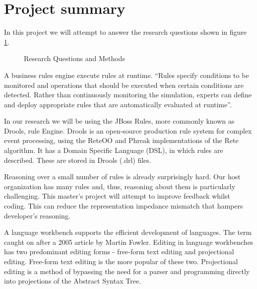 \section{Project summary}

In this project we will attempt to answer the research questions shown in figure \ref{fig:Research_Questions}.
\begin{figure}[H]
    \centering
    \caption{Research Questions and Methods}
    \label{fig:Research_Questions}
\end{figure}


A business rules engine execute rules at runtime. 
``Rules specify conditions to be monitored and operations that should be executed when certain conditions are detected.
Rather than continuously monitoring the simulation, experts can define and deploy appropriate rules that are automatically evaluated at runtime''\cite{liu2003dios++}. 

In our research we will be using the JBoss Rules, more commonly known as Drools, rule Engine\cite{browne2009jboss}.
Drools is an open-source production rule system for complex event processing, using the ReteOO and Phreak implementations of the Rete algorithm\cite{forgy1989rete}.
It has a Domain Specific Language (DSL), in which rules are described.
These are stored in Drools (.drl) files. 

Reasoning over a small number of rules is already surprisingly hard.
Our host organization has many rules and, thus, reasoning about them is particularly challenging.
This master's project will attempt to improve feedback whilst coding.
This can reduce the representation impedance mismatch that hampers developer's reasoning.

A language workbench supports the efficient development of languages. 
The term caught on after a 2005 article by Martin Fowler\cite{Fowler_lwb}. 
Editing in language workbenches has two predominant editing forms - free-form text editing and projectional editing\cite{erdweg2013state}.
Free-form text editing is the more popular of these two.
Projectional editing is a method of bypassing the need for a parser and programming directly into projections of the Abstract Syntax Tree.

